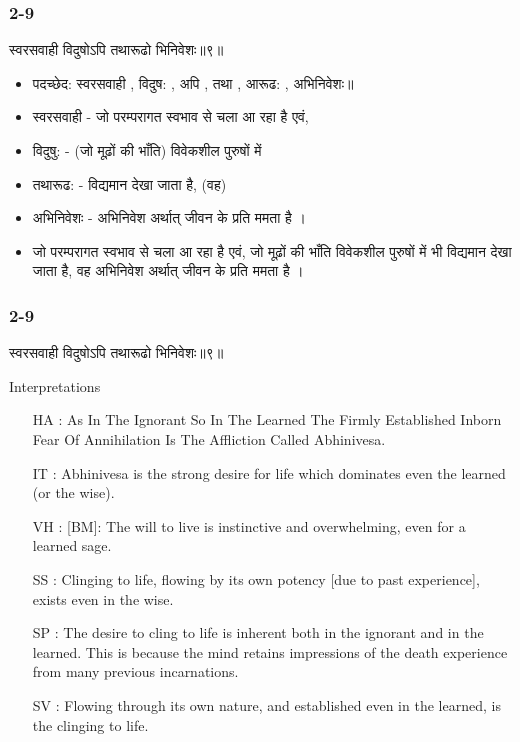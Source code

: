 \begin{frame}[fragile]\frametitle{2-9}
\begin{sanskrit}
स्वरसवाही विदुषोऽपि तथारूढो भिनिवेशः॥९॥
\end{sanskrit}

	\begin{itemize}
	\item पदच्छेद: स्वरसवाही , विदुष: , अपि , तथा , आरूढ: , अभिनिवेशः॥
	\item स्वरसवाही - जो परम्परागत स्वभाव से चला आ रहा है एवं,
	\item विदुषु: - (जो मूढ़ों की भाँति) विवेकशील पुरुषों में
	\item तथारूढ: - विद्यमान देखा जाता है, (वह)
	\item अभिनिवेशः - अभिनिवेश अर्थात् जीवन के प्रति ममता है ।	
	\item जो परम्परागत स्वभाव से चला आ रहा है एवं, जो मूढ़ों की भाँति विवेकशील पुरुषों में भी विद्यमान देखा जाता है, वह अभिनिवेश अर्थात् जीवन के प्रति ममता है ।
	\end{itemize}

\end{frame}

\begin{frame}[fragile]\frametitle{2-9}
\begin{sanskrit}
स्वरसवाही विदुषोऽपि तथारूढो भिनिवेशः॥९॥
\end{sanskrit}

Interpretations
\begin{itemize}
\item [HA]: As In The Ignorant So In The Learned The Firmly Established Inborn Fear Of Annihilation Is The Affliction Called Abhinivesa.
\item [IT]: Abhinivesa is the strong desire for life which dominates even the learned (or the wise).
\item [VH]: [BM]: The will to live is instinctive and overwhelming, even for a learned sage.
\item [SS]: Clinging to life, flowing by its own potency [due to past experience], exists even in the wise.
\item [SP]: The desire to cling to life is inherent both in the ignorant and in the learned. This is because the mind retains impressions of the death experience from many previous incarnations.
\item [SV]: Flowing through its own nature, and established even in the learned, is the clinging to life. 
\end{itemize}

\end{frame}

